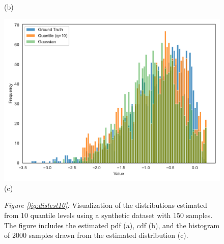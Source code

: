 \begin{landscape}
\begin{figure}[H]
\begin{minipage}[b]{0.4\textwidth}
    \\[0.5em]
    {\small (b)}
  \end{minipage}
  \hfill
   \begin{minipage}[b]{0.4\textwidth}
    \centering
    \includegraphics[width=\linewidth]{figs/10_rvs_plot.pdf}
    \\[0.5em]
    {\small (c)}
  \end{minipage}
 
 \vspace{1em}
 \parbox{\linewidth}{
 	 {\small \textit{Figure \ref{fig:distest10}:} Visualization of the distributions estimated from 10 quantile levels using a synthetic dataset with 150 samples. The figure includes the estimated \gls{pdf} (a), \gls{cdf} (b), and the histogram of 2000 samples drawn from the estimated distribution (c).}
 }
\end{figure}


\end{landscape}
